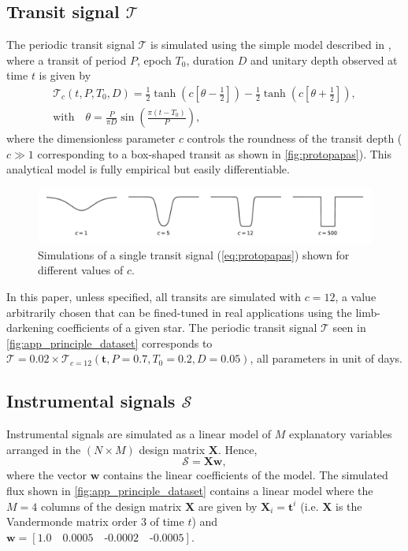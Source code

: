 \documentclass[modern]{aastex631}
\begin{document}
\subsection{Transit signal $\mathcal{T}$}\label{app_proto}
The periodic transit signal $\mathcal{T}$ is simulated using the simple model described in \cite{protopapas}, where a transit of period $P$, epoch $T_0$, duration $D$ and unitary depth observed at time $t$ is given by
\begin{equation}\label{eq:protopapas}
    \begin{gathered}
        \mathcal{T}_c(t, P, T_0, D) = \frac{1}{2}\tanh\left(c\left[\theta - \frac{1}{2}\right]\right) - \frac{1}{2}\tanh\left(c\left[\theta + \frac{1}{2}\right]\right), \\
        \text{with}\quad\theta = \frac{P}{\pi  D}\sin\left(\frac{\pi(t-T_0)}{P}\right),
    \end{gathered}
\end{equation}
where the dimensionless parameter $c$ controls the roundness of the transit depth ($c\gg1$ corresponding to a box-shaped transit as shown in \autoref{fig:protopapas}). This analytical model is fully empirical but easily differentiable.
\begin{figure}[H]
    \begin{centering}
        \includegraphics[width=\linewidth]{../workflows/principle/figures/protopapas.pdf}
        \caption{Simulations of a single transit signal (\autoref{eq:protopapas}) shown for different values of $c$.}
        \label{fig:protopapas}
    \end{centering}
\end{figure}
\noindent In this paper, unless specified, all transits are simulated with $c=12$, a value arbitrarily chosen that can be fined-tuned in real applications using the limb-darkening coefficients of a given star. The periodic transit signal $\mathcal{T}$ seen in \autoref{fig:app_principle_dataset} corresponds to $\mathcal{T} = 0.02 \times \mathcal{T}_{c=12}(\bm{t}, P=0.7, T_0=0.2, D=0.05)$, all parameters in unit of days.

\subsection{Instrumental signals $\mathcal{S}$}
Instrumental signals are simulated as a linear model of $M$ explanatory variables arranged in the $(N\times M)$ design matrix $\bm{X}$. Hence,
$$
    \mathcal{S} = \bm{X w},
$$
where the vector $\bm{w}$ contains the linear coefficients of the model. The simulated flux shown in \autoref{fig:app_principle_dataset} contains a linear model where the $M=4$ columns of the design matrix $\bm{X}$ are given by $\bm{X}_{i} = \bm{t}^i$ (i.e. $\bm{X}$ is the Vandermonde matrix order $3$ of time $t$) and $\bm{w} = [1.0\quad0.0005\quad\text{-}0.0002\quad\text{-}0.0005].$
\end{document}

